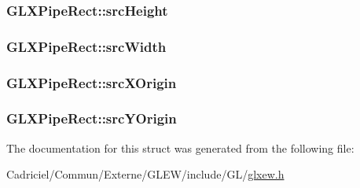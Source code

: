 \hypertarget{struct_g_l_x_pipe_rect_a35632524bce6bffa05f284a9b1c1b8ff}{
\subsubsection[{src\-Height}]{ G\-L\-X\-Pipe\-Rect\-::src\-Height}}\label{struct_g_l_x_pipe_rect_a35632524bce6bffa05f284a9b1c1b8ff}
\hypertarget{struct_g_l_x_pipe_rect_a2c6c180a4dabb71076366e06a1c7d0ef}{
\subsubsection[{src\-Width}]{ G\-L\-X\-Pipe\-Rect\-::src\-Width}}\label{struct_g_l_x_pipe_rect_a2c6c180a4dabb71076366e06a1c7d0ef}
\hypertarget{struct_g_l_x_pipe_rect_a9df2313c01f75d149e64f2ff467bc266}{
\subsubsection[{src\-X\-Origin}]{ G\-L\-X\-Pipe\-Rect\-::src\-X\-Origin}}\label{struct_g_l_x_pipe_rect_a9df2313c01f75d149e64f2ff467bc266}
\hypertarget{struct_g_l_x_pipe_rect_a1f7316dff7050ab2ce9d3d37f8c5450e}{
\subsubsection[{src\-Y\-Origin}]{ G\-L\-X\-Pipe\-Rect\-::src\-Y\-Origin}}\label{struct_g_l_x_pipe_rect_a1f7316dff7050ab2ce9d3d37f8c5450e}


The documentation for this struct was generated from the following file\-:\begin{DoxyCompactItemize}
\item 
Cadriciel/\-Commun/\-Externe/\-G\-L\-E\-W/include/\-G\-L/\hyperlink{glxew_8h}{glxew.\-h}\end{DoxyCompactItemize}
